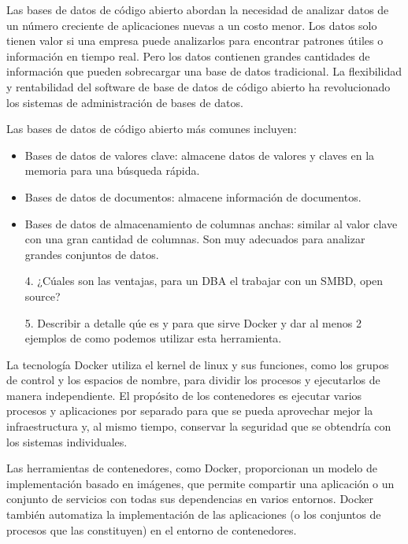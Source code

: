 \documentclass{article}
\begin{document}
Las bases de datos de código abierto abordan la necesidad de analizar datos de un número creciente de aplicaciones nuevas a un costo menor.  Los datos solo tienen valor si una empresa puede analizarlos para encontrar patrones útiles o información en tiempo real. Pero los datos contienen grandes cantidades de información que pueden sobrecargar una base de datos tradicional. La flexibilidad y rentabilidad del software de base de datos de código abierto ha revolucionado los sistemas de administración de bases de datos. 

Las bases de datos de código abierto más comunes incluyen: 
\begin{itemize}
    \item Bases de datos de valores clave: almacene datos de valores y claves en la memoria para una búsqueda rápida. 
    \item Bases de datos de documentos: almacene información de documentos. 
    \item Bases de datos de almacenamiento de columnas anchas: similar al valor clave con una gran cantidad de columnas. Son muy adecuados para analizar grandes conjuntos de datos.
\end{itemize}
    
\begin{itemize}
    \item[4.]¿C\'uales son las ventajas, para un DBA el trabajar con un SMBD, open source?
\end{itemize}
     
     
    
\begin{itemize}
    \item[5.]Describir a detalle q\'ue es y para que sirve Docker y dar al menos 2 ejemplos de como podemos utilizar esta herramienta.
\end{itemize}
La tecnología Docker utiliza el kernel de linux y sus funciones, como los grupos de control y los espacios de nombre, para dividir los procesos y ejecutarlos de manera independiente. El propósito de los contenedores es ejecutar varios procesos y aplicaciones por separado para que se pueda aprovechar mejor la infraestructura y, al mismo tiempo, conservar la seguridad que se obtendría con los sistemas individuales. 

Las herramientas de contenedores, como Docker, proporcionan un modelo de implementación basado en imágenes, que permite compartir una aplicación o un conjunto de servicios con todas sus dependencias en varios entornos. Docker también automatiza la implementación de las aplicaciones (o los conjuntos de procesos que las constituyen) en el entorno de contenedores. 
\end{document}
